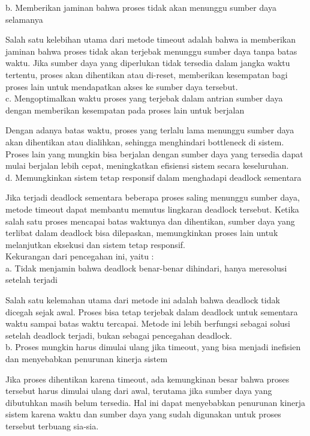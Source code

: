 \documentclass[12pt]{article}
\begin{document}
    b. Memberikan jaminan bahwa proses tidak akan menunggu sumber daya selamanya 
    
    Salah satu kelebihan utama dari metode timeout adalah bahwa ia memberikan jaminan bahwa proses tidak akan terjebak menunggu sumber daya tanpa batas waktu. Jika sumber daya yang diperlukan tidak tersedia dalam jangka waktu tertentu, proses akan dihentikan atau di-reset, memberikan kesempatan bagi proses lain untuk mendapatkan akses ke sumber daya tersebut.\\

    c. Mengoptimalkan waktu proses yang terjebak dalam antrian sumber daya dengan memberikan kesempatan pada proses lain untuk berjalan
    
    Dengan adanya batas waktu, proses yang terlalu lama menunggu sumber daya akan dihentikan atau dialihkan, sehingga menghindari bottleneck di sistem. Proses lain yang mungkin bisa berjalan dengan sumber daya yang tersedia dapat mulai berjalan lebih cepat, meningkatkan efisiensi sistem secara keseluruhan.\\

    d. Memungkinkan sistem tetap responsif dalam menghadapi deadlock sementara
    
    Jika terjadi deadlock sementara  beberapa proses saling menunggu sumber daya, metode timeout dapat membantu memutus lingkaran deadlock tersebut. Ketika salah satu proses mencapai batas waktunya dan dihentikan, sumber daya yang terlibat dalam deadlock bisa dilepaskan, memungkinkan proses lain untuk melanjutkan eksekusi dan sistem tetap responsif.\\

    Kekurangan dari pencegahan ini, yaitu :\\

    a. Tidak menjamin bahwa deadlock benar-benar dihindari, hanya meresolusi setelah terjadi
    
    Salah satu kelemahan utama dari metode ini adalah bahwa deadlock tidak dicegah sejak awal. Proses bisa tetap terjebak dalam deadlock untuk sementara waktu sampai batas waktu tercapai. Metode ini lebih berfungsi sebagai solusi setelah deadlock terjadi, bukan sebagai pencegahan deadlock.\\

    b. Proses mungkin harus dimulai ulang jika timeout, yang bisa menjadi inefisien dan menyebabkan penurunan kinerja sistem
    
    Jika proses dihentikan karena timeout, ada kemungkinan besar bahwa proses tersebut harus dimulai ulang dari awal, terutama jika sumber daya yang dibutuhkan masih belum tersedia. Hal ini dapat menyebabkan penurunan kinerja sistem karena waktu dan sumber daya yang sudah digunakan untuk proses tersebut terbuang sia-sia.\\
\end{document}
